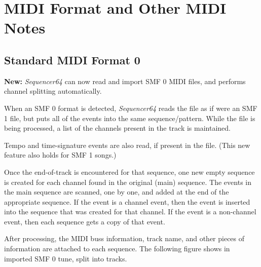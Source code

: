 %
%
%

\section{MIDI Format and Other MIDI Notes}
\label{sec:midi_format_and_midi_notes}

\subsection{Standard MIDI Format 0}
\label{subsec:midi_format_smf_0}

   \textbf{New:}
   \textsl{Sequencer64} can now read and import SMF 0 MIDI files, and performs
   channel splitting automatically.

   When an SMF 0 format is detected, \textsl{Sequencer64}
   reads the file as if were an SMF 1 file, but puts all of the events into the
   same sequence/pattern.  While the file is being processed, a list of the
   channels present in the track is maintained.

   Tempo and time-signature events are also read, if present in the file.
   (This new feature also holds for SMF 1 songs.)

   Once the end-of-track is encountered for that sequence, one new empty
   sequence is created for each channel found in the original (main) sequence.
   The events in the main sequence are scanned, one by one, and added at the
   end of the appropriate sequence.  If the event is a channel event,
   then the event is inserted into the sequence that was created for that
   channel.  If the event is a non-channel event, then each sequence gets a
   copy of that event.

   After processing, the MIDI buss information, track name, and other pieces of
   information are attached to each sequence.  The following figure shows in
   imported SMF 0 tune, split into tracks.

